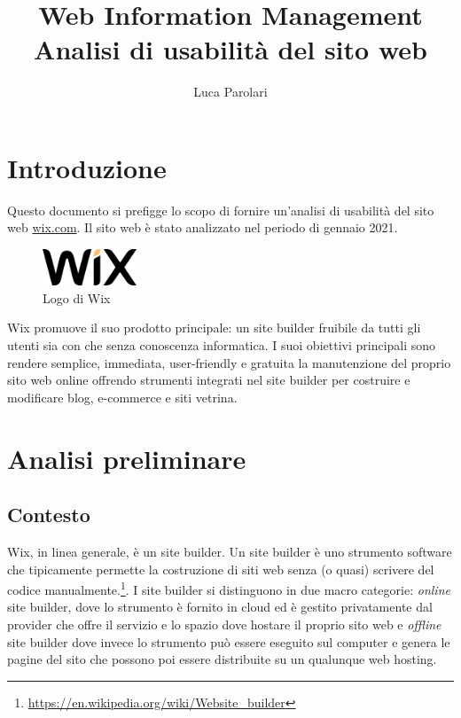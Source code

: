 \documentclass[11pt,a4paper]{article}
\author{Luca Parolari}
\title{Web Information Management\\ \large Analisi di usabilità del sito web \wixcom{}}
\newcommand*{\wix}{Wix}
\newcommand*{\wixcom}{wix.com}
\begin{document}
\maketitle

\clearpage
\tableofcontents

\clearpage

\section{Introduzione}
\label{sec:intro}

Questo documento si prefigge lo scopo di fornire un'analisi di
usabilità del sito web \href{https://wix.com}{\wixcom{}}. Il sito web è
stato analizzato nel periodo di gennaio 2021.

\begin{figure}[h]
  \centering
  \includegraphics[width=0.25\textwidth]{wix-logo}
  \caption{Logo di \wix{}}
  \label{fix:wix-logo}
\end{figure}

\wix{} promuove il suo prodotto principale: un site builder fruibile da
tutti gli utenti sia con che senza conoscenza informatica. I suoi
obiettivi principali sono rendere semplice, immediata, user-friendly e
gratuita la manutenzione del proprio sito web online offrendo
strumenti integrati nel site builder per costruire e modificare blog,
e-commerce e siti vetrina.

\section{Analisi preliminare}
\label{sec:preliminary-analysis}

\subsection{Contesto}
\label{subsec:context}

\wix{}, in linea generale, è un site builder. Un site builder è uno
strumento software che tipicamente permette la costruzione di siti web
senza (o quasi) scrivere del codice
manualmente.\footnote{\url{https://en.wikipedia.org/wiki/Website_builder}}.
I
site builder si distinguono in due macro categorie: \emph{online} site
builder, dove lo strumento è fornito in cloud ed è gestito
privatamente dal provider che offre il servizio e lo spazio dove
hostare il proprio sito web e \emph{offline} site builder dove invece
lo strumento può essere eseguito sul computer e genera le pagine del
sito che possono poi essere distribuite su un qualunque web hosting.
\end{document}

